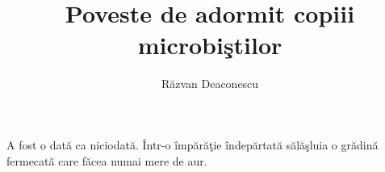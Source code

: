 \documentclass[12pt,a4paper,titlepage,landscape,romanian]{slides}
\begin{document}
\title{Poveste de adormit copiii microbi\c{s}tilor}
\author{R\u{a}zvan Deaconescu}
\maketitle

A fost o dat\u{a} ca niciodat\u{a}. \^{I}ntr-o \^{i}mp\u{a}r\u{a}\c{t}ie
\^{i}ndep\u{a}rtat\u{a} s\u{a}l\u{a}\c{s}luia o gr\u{a}din\u{a} fermecat\u{a}
care f\u{a}cea numai mere de aur.
\end{document}
